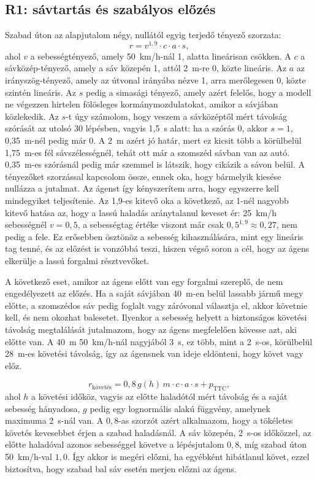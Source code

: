 \documentclass[a4paper,12pt,oneside]{article}
\begin{document}
\subsection{R1: sávtartás és szabályos előzés}
\label{subsec:reward1}

Szabad úton az alapjutalom négy, nullától egyig terjedő tényező szorzata:
\begin{equation}
  r = v^{1,9} \cdot c \cdot a \cdot s,
  \label{eq:r1_free}
\end{equation}
ahol $v$ a sebességtényező, amely 50~km/h-nál 1, alatta lineárisan csökken. A $c$ a sávközép-tényező,
amely a sáv közepén 1, attól 2~m-re 0, közte lineáris. Az $a$ az irányszög-tényező, amely az útvonal irányába nézve
1, arra merőlegesen 0, közte szintén lineáris. Az $s$ pedig a simasági tényező, amely azért felelős, hogy a modell ne végezzen hirtelen fölösleges kormánymozdulatokat,
amikor a sávjában közlekedik. Az $s$-t úgy számolom, hogy veszem a sávközéptől mért
távolság szórását az utolsó 30 lépésben, vagyis 1,5~s alatt: ha a szórás 0, akkor $s = 1$, 0,35~m-nél pedig
már 0. A 2~m azért jó határ, mert ez kicsit több a körülbelül 1,75~m-es fél sávszélességnél, tehát ott
már a szomszéd sávban van az autó. 0,35~m-es szórásnál pedig már szemmel is látszik, hogy
cikázik a sávon belül.  
A tényezőket szorzással kapcsolom össze, ennek oka, hogy bármelyik kiesése
nullázza a jutalmat. Az ágenst így kényszerítem arra, hogy egyszerre kell mindegyiket teljesítenie. 
Az 1,9-es kitevő oka a következő, az 1-nél nagyobb kitevő hatása az, hogy a lassú
haladás aránytalanul keveset ér: 25~km/h sebességnél $v = 0{,}5$, a sebességtag értéke
viszont már csak $0{,}5^{1,9} \approx 0{,}27$, nem pedig a fele. Ez erősebben ösztönöz
a sebesség kihasználására, mint egy lineáris tag tenné, és az előzést is vonzóbbá teszi, hiszen végső soron a cél, hogy az ágens elkerülje a lassú forgalmi résztvevőket.

A következő eset, amikor az ágens előtt van egy forgalmi szereplő, de nem engedélyezett az előzés.
Ha a saját sávjában 40~m-en belül lassabb jármű megy előtte, a szomszédos sáv pedig foglalt vagy záróvonal választja el, 
akkor követnie kell, és nem okozhat balesetet. Ilyenkor a sebesség helyett
a biztonságos követési távolság megtalálását jutalmazom, hogy az ágens 
megfelelően kövesse azt, aki előtte van.
A 40~m 50~km/h-nál nagyjából 3~s, ez több, mint a 2~s-os, körülbelül 28~m-es követési távolság,
így az ágensnek van ideje eldönteni, hogy követ vagy előz.

\begin{equation}
  r_{\text{követés}} = 0{,}8 \, g(h) \, m \cdot c \cdot a \cdot s + p_{\text{TTC}},
  \label{eq:r1_follow}
\end{equation}
ahol $h$ a követési időköz, vagyis az előtte haladótól mért távolság és a saját sebesség
hányadosa, $g$ pedig egy lognormális alakú függvény, 
amelynek maximuma 2~s-nál van. A $0{,}8$-as szorzót azért
alkalmazom, hogy a tökéletes követés kevesebbet érjen a szabad haladásnál. A sáv
közepén, 2~s-os időközzel, az előtte haladóval azonos sebességgel követve a
lépésjutalom $0{,}8$, míg szabad úton 50~km/h-val $1{,}0$. Így akkor is megéri előzni, ha egyébként hibátlanul követ, ezzel biztosítva, hogy szabad bal sáv esetén merjen előzni az ágens.
\end{document}
